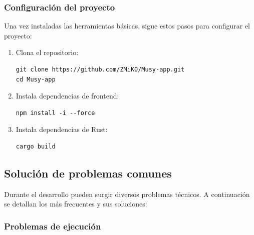 \documentclass[11pt, a4paper]{article}
\begin{document}
    \subsubsection{Configuración del proyecto}

    Una vez instaladas las herramientas básicas, sigue estos pasos para configurar el proyecto:

    \begin{enumerate}
      \item Clona el repositorio:
        \begin{lstlisting}[caption={Clona el repositorio}]
git clone https://github.com/ZMiK0/Musy-app.git
cd Musy-app
        \end{lstlisting}
        
      \item Instala dependencias de frontend:
        \begin{lstlisting}[caption={Instala las dependencias}]
npm install -i --force
        \end{lstlisting}
        
      \item Instala dependencias de Rust:
        \begin{lstlisting}[caption={Instala las dependencias de Rust}]
cargo build
        \end{lstlisting}
    \end{enumerate}

  \subsection{Solución de problemas comunes}

  Durante el desarrollo pueden surgir diversos problemas técnicos. A continuación se detallan los más frecuentes y sus soluciones:

    \subsubsection{Problemas de ejecución}
\end{document}

